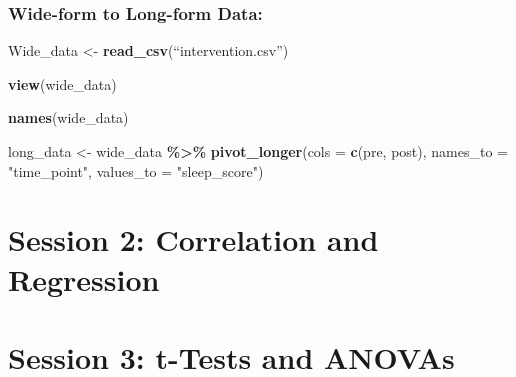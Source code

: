 \documentclass[
]{book}
\newenvironment{Shaded}{\begin{snugshade}}{\end{snugshade}}
\newcommand{\AttributeTok}[1]{\textcolor[rgb]{0.13,0.29,0.53}{#1}}
\newcommand{\FunctionTok}[1]{\textcolor[rgb]{0.13,0.29,0.53}{\textbf{#1}}}
\newcommand{\NormalTok}[1]{#1}
\newcommand{\OtherTok}[1]{\textcolor[rgb]{0.56,0.35,0.01}{#1}}
\newcommand{\SpecialCharTok}[1]{\textcolor[rgb]{0.81,0.36,0.00}{\textbf{#1}}}
\newcommand{\StringTok}[1]{\textcolor[rgb]{0.31,0.60,0.02}{#1}}
\begin{document}
\subsection{Wide-form to Long-form Data:}\label{wide-form-to-long-form-data}

\begin{Shaded}
\begin{Highlighting}[]
\NormalTok{Wide\_data }\OtherTok{\textless{}{-}} \FunctionTok{read\_csv}\NormalTok{(“intervention.csv”)}

\FunctionTok{view}\NormalTok{(wide\_data)}
\end{Highlighting}
\end{Shaded}

\begin{Shaded}
\begin{Highlighting}[]
\FunctionTok{names}\NormalTok{(wide\_data)}

\NormalTok{long\_data }\OtherTok{\textless{}{-}}\NormalTok{ wide\_data }\SpecialCharTok{\%\textgreater{}\%}  
    \FunctionTok{pivot\_longer}\NormalTok{(}\AttributeTok{cols =} \FunctionTok{c}\NormalTok{(pre, post), }
    \AttributeTok{names\_to =} \StringTok{"time\_point"}\NormalTok{, }
    \AttributeTok{values\_to =} \StringTok{"sleep\_score"}\NormalTok{)}
\end{Highlighting}
\end{Shaded}

\chapter{Session 2: Correlation and Regression}\label{session-2-correlation-and-regression}

\chapter{Session 3: t-Tests and ANOVAs}\label{session-3-t-tests-and-anovas}
\end{document}
